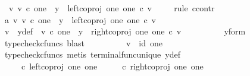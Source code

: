 \begin{isabellebody}
\ {\isachardoublequoteopen}{\isasymexists}\ v{\isachardot}{\kern0pt}\ v\ {\isasymin}\isactrlsub c\ one\ {\isasymand}\ y\ {\isacharequal}{\kern0pt}\ left{\isacharunderscore}{\kern0pt}coproj\ one\ one\ {\isasymcirc}\isactrlsub c\ v{\isachardoublequoteclose}\isanewline
\ \ \ \ \isamarkupfalse%
{\isacharparenleft}{\kern0pt}rule\ ccontr{\isacharparenright}{\kern0pt}\isanewline
\ \ \ \ \ \ \isamarkupfalse%
\ a{}{\isacharcolon}{\kern0pt}\ {\isachardoublequoteopen}{\isasymnexists}v{\isachardot}{\kern0pt}\ v\ {\isasymin}\isactrlsub c\ one\ {\isasymand}\ y\ {\isacharequal}{\kern0pt}\ left{\isacharunderscore}{\kern0pt}coproj\ one\ one\ {\isasymcirc}\isactrlsub c\ v{\isachardoublequoteclose}\isanewline
\ \ \ \ \ \ \isamarkupfalse%
\ \isamarkupfalse%
\ v\ \ y{\isacharunderscore}{\kern0pt}def{\isacharcolon}{\kern0pt}\ \ {\isachardoublequoteopen}v\ {\isasymin}\isactrlsub c\ one\ {\isasymand}\ y\ {\isacharequal}{\kern0pt}\ right{\isacharunderscore}{\kern0pt}coproj\ one\ one\ {\isasymcirc}\isactrlsub c\ v{\isachardoublequoteclose}\isanewline
\ \ \ \ \ \ \ \ \isamarkupfalse%
\ y{\isacharunderscore}{\kern0pt}form\ \isamarkupfalse%
\ {\isacharparenleft}{\kern0pt}typecheck{\isacharunderscore}{\kern0pt}cfuncs{\isacharcomma}{\kern0pt}\ blast{\isacharparenright}{\kern0pt}\isanewline
\ \ \ \ \ \ \isamarkupfalse%
\ \isamarkupfalse%
\ {\isachardoublequoteopen}v\ {\isacharequal}{\kern0pt}\ id\ one{\isachardoublequoteclose}\isanewline
\ \ \ \ \ \ \ \ \isamarkupfalse%
\ {\isacharparenleft}{\kern0pt}typecheck{\isacharunderscore}{\kern0pt}cfuncs{\isacharcomma}{\kern0pt}\ metis\ terminal{\isacharunderscore}{\kern0pt}func{\isacharunderscore}{\kern0pt}unique\ y{\isacharunderscore}{\kern0pt}def{\isacharparenright}{\kern0pt}\isanewline
\ \ \ \ \ \ \isamarkupfalse%
\ \isamarkupfalse%
\ {\isachardoublequoteopen}{\isasymlangle}{\isasymt}{\isacharcomma}{\kern0pt}\ {\isasymt}{\isasymrangle}\ {\isasymamalg}{\isasymlangle}{\isasymf}{\isacharcomma}{\kern0pt}\ {\isasymf}{\isasymrangle}\ {\isasymcirc}\isactrlsub c\ left{\isacharunderscore}{\kern0pt}coproj\ one\ one\ {\isacharequal}{\kern0pt}\ {\isasymlangle}{\isasymt}{\isacharcomma}{\kern0pt}\ {\isasymt}{\isasymrangle}\ {\isasymamalg}{\isasymlangle}{\isasymf}{\isacharcomma}{\kern0pt}\ {\isasymf}{\isasymrangle}\ {\isasymcirc}\isactrlsub c\ right{\isacharunderscore}{\kern0pt}coproj\ one\ one{\isachardoublequoteclose}\isanewline
\ \ \ \ \ \ \ \ \isamarkupfalse%

\end{isabellebody}
